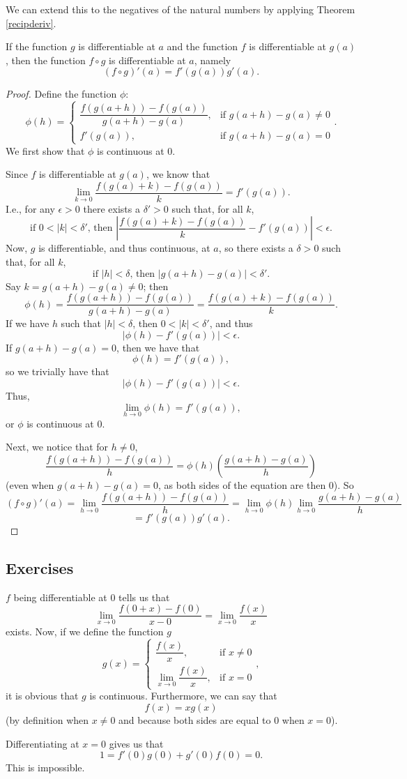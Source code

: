 \begin{remark}
We can extend this to the negatives of the natural numbers by applying Theorem \ref{recipderiv}.
\end{remark}

\begin{theorem}
If the function $g$ is differentiable at $a$ and the function $f$ is differentiable at $g(a)$, then the function $f \circ g$ is differentiable at $a$, namely
\[ (f \circ g)'(a) = f'(g(a))g'(a). \]

\begin{proof}
Define the function $\phi$:
\[ \phi (h) = \begin{cases} \dfrac{f(g(a+h))-f(g(a))}{g(a+h)-g(a)}, & \textrm{if } g(a+h)-g(a) \ne 0 \\ f'(g(a)), & \textrm{if } g(a+h)-g(a) = 0 \end{cases}. \]
We first show that $\phi$ is continuous at 0. 

Since $f$ is differentiable at $g(a)$, we know that
\[ \lim_{k \to 0} \frac{f(g(a)+k)-f(g(a))}k = f'(g(a)). \]
I.e., for any $\epsilon > 0$ there exists a $\delta' > 0$ such that, for all $k$,
\[ \textrm{if } 0 < |k| < \delta' \textrm{, then } \left|\frac{f(g(a)+k)-f(g(a))}k - f'(g(a))\right| < \epsilon. \]
Now, $g$ is differentiable, and thus continuous, at $a$, so there exists a $\delta > 0$ such that, for all $k$,
\[ \textrm{if } |h| < \delta \textrm{, then } |g(a+h) - g(a)| < \delta'. \]
Say $k = g(a+h)-g(a) \ne 0$; then
\[ \phi(h) = \frac{f(g(a+h)) - f(g(a))}{g(a+h)-g(a)} = \frac{f(g(a)+k)-f(g(a))}{k}. \]
If we have $h$ such that $|h| < \delta$, then $0 < |k| < \delta'$, and thus
\[ |\phi(h)-f'(g(a))| < \epsilon. \]
If $g(a+h) - g(a) = 0$, then we have that
\[ \phi(h) = f'(g(a)), \]
so we trivially have that
\[ |\phi(h)-f'(g(a))| < \epsilon. \]
Thus, 
\[ \lim_{h \to 0} \phi(h) = f'(g(a)), \]
or $\phi$ is continuous at 0. 

Next, we notice that for $h \ne 0$,
\[ \frac{f(g(a+h))-f(g(a))}{h} = \phi(h)\left(\frac{g(a+h)-g(a)}{h}\right) \]
(even when $g(a+h)-g(a) = 0$, as both sides of the equation are then 0). So
\[ (f \circ g)'(a) = \lim_{h \to 0} \frac{f(g(a+h))-f(g(a))}{h} = \lim_{h\to0}\phi(h) \lim_{h\to0}\frac{g(a+h)-g(a)}{h} \]
\[ = f'(g(a))g'(a). \]
\end{proof}
\end{theorem}

\subsection{Exercises}
\begin{problem}[10-27]
$f$ being differentiable at 0 tells us that
\[ \lim_{x \to 0} \frac{f(0 + x) - f(0)}{x - 0} = \lim_{x \to 0} \frac{f(x)}{x} \]
exists. Now, if we define the function $g$
\[ g(x) = \begin{cases} \dfrac{f(x)}{x}, & \textrm{if } x \ne 0 \\ \lim_{x \to 0} \dfrac{f(x)}{x}, & \textrm{if } x = 0 \end{cases}, \]
it is obvious that $g$ is continuous. Furthermore, we can say that 
\[ f(x) = xg(x) \]
(by definition when $x \ne 0$ and because both sides are equal to 0 when $x = 0$).
\end{problem}

\begin{problem}[10-29]
Differentiating at $x = 0$ gives us that
\[ 1 = f'(0)g(0) + g'(0)f(0) = 0. \]
This is impossible.
\end{problem}
